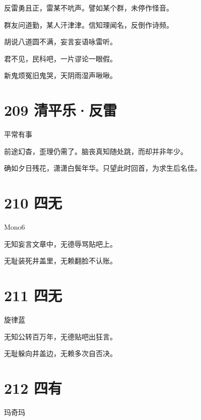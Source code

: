 \documentclass[UTF8,12pt,oneside]{ctexbook}
\begin{document}
        反雷勇且正，雷某不吭声。譬如某个群，未停作怪音。
        
        群友问道勤，某人汗津津。信知理闻名，反倒作诗频。
        
        胡说八道圆不满，妄言妄语咏雷听。

        君不见，民科吧，一片谬论一眼假。
        
        新鬼烦冤旧鬼哭，天阴雨湿声啾啾。

        \section{209 清平乐·反雷}
        \begin{center}
            平常有事
        \end{center}
        
        前途幻杳，歪理仍需了。脑丧真知随处跳，而却并非年少。
        
        确如夕日残花，潇潇白鬓年华。只望此时回首，为求生后名佳。
        \section{210 四无}
        \begin{center}
            Mono6
        \end{center}
        
        \begin{center}
        无知妄言文章中，无德辱骂贴吧上。
        
        无耻装死井盖里，无赖翻脸不认账。
        \end{center}

        \section{211 四无}
        \begin{center}
            旋律蓝
        \end{center}
        
        \begin{center}
        无知公转百万年，无德贴吧出狂言。
        
        无耻躲向井盖边，无赖多次自否决。
        \end{center}

        \section{212 四有}
        \begin{center}
            玛奇玛
        \end{center}
        
\end{document}
